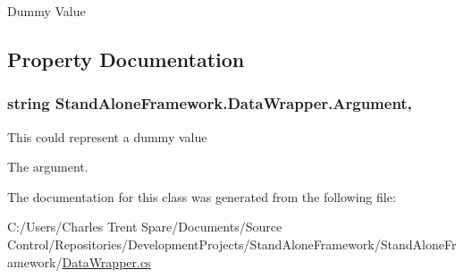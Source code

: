Dummy Value 



\subsection{Property Documentation}
\hypertarget{class_stand_alone_framework_1_1_data_wrapper_a37c856045eb222ea573dee4a2e64e34d}{
\subsubsection[{Argument}]{\setlength{\rightskip}{0pt plus 5cm}string Stand\+Alone\+Framework.\+Data\+Wrapper.\+Argument\hspace{0.3cm}{\ttfamily [get]}, {\ttfamily [set]}}}\label{class_stand_alone_framework_1_1_data_wrapper_a37c856045eb222ea573dee4a2e64e34d}


This could represent a dummy value 

The argument.

The documentation for this class was generated from the following file\+:\begin{DoxyCompactItemize}
\item 
C\+:/\+Users/\+Charles Trent Spare/\+Documents/\+Source Control/\+Repositories/\+Development\+Projects/\+Stand\+Alone\+Framework/\+Stand\+Alone\+Framework/\hyperlink{_data_wrapper_8cs}{Data\+Wrapper.\+cs}\end{DoxyCompactItemize}
